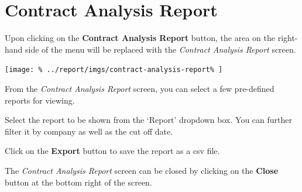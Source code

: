 \documentclass[../main/main]{subfiles}
\begin{document}
\newpage
\section{Contract Analysis Report}
\label{sec:contract-analysis-report}

Upon clicking on the \textbf{Contract Analysis Report} button,
the area on the right-hand side of the menu will be replaced with the
\emph{Contract Analysis Report} screen.

\texttt{[image: \%
  ../report/imgs/contract-analysis-report\%
]}

From the \emph{Contract Analysis Report} screen, you can select a few
pre-defined reports for viewing.

Select the report to be shown from the `Report' dropdown box. You can further
filter it by company as well as the cut off date.

Click on the \textbf{Export} button to save the report as a csv file.

The \emph{Contract Analysis Report} screen can be closed by clicking on the
\textbf{Close} button at the bottom right of the screen.
\end{document}
